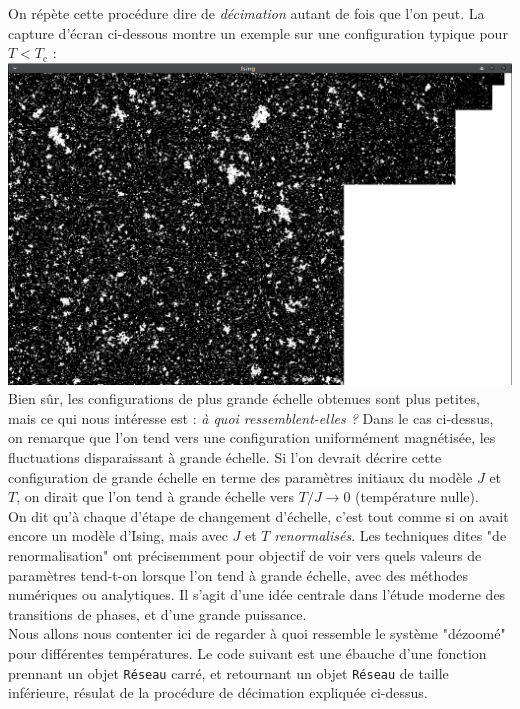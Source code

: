 \documentclass{book}
\newcommand{\inline}[1]{\texttt{#1}}
\begin{document}
On répète cette procédure dire de \emph{décimation} autant de fois que l'on peut. La capture d'écran ci-dessous montre un exemple sur une configuration typique pour $T<T_\text{c}$ :\\
\vspace{1em}
\includegraphics[width=1\linewidth]{TD3/decim_T_sur_Tc_0.98.png}\\

Bien sûr, les configurations de plus grande échelle obtenues sont plus petites, mais ce qui nous intéresse est : \emph{à quoi ressemblent-elles ?} Dans le cas ci-dessus, on remarque que l'on tend vers une configuration uniformément magnétisée, les fluctuations disparaissant à grande échelle. Si l'on devrait décrire cette configuration de grande échelle en terme des paramètres initiaux du modèle $J$ et $T$, on dirait que l'on tend à grande échelle vers $T/J\to 0$ (température nulle).\\

On dit qu'à chaque d'étape de changement d'échelle, c'est tout comme si on avait encore un modèle d'Ising, mais avec $J$ et $T$ \emph{renormalisés}. Les techniques dites "de renormalisation" ont précisemment pour objectif de voir vers quels valeurs de paramètres tend-t-on lorsque l'on tend à grande échelle, avec des méthodes numériques ou analytiques. Il s'agit d'une idée centrale dans l'étude moderne des transitions de phases, et d'une grande puissance.\\

Nous allons nous contenter ici de regarder à quoi ressemble le système "dézoomé" pour différentes températures. Le code suivant est une ébauche d'une fonction prennant un objet \inline{Réseau} carré, et retournant un objet \inline{Réseau} de taille inférieure, résulat de la procédure de décimation expliquée ci-dessus.
\end{document}
